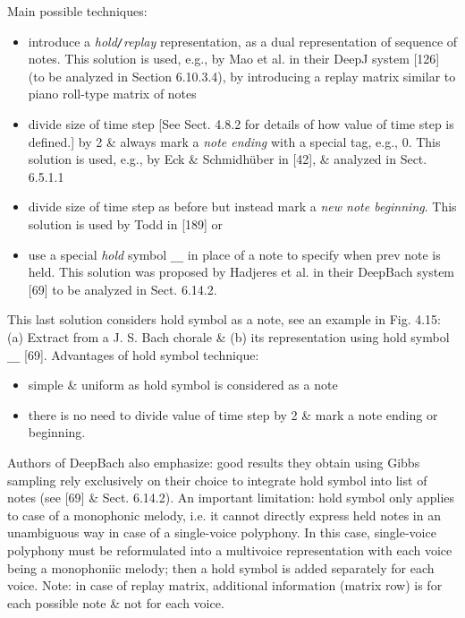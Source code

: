 \documentclass{article}
\begin{document}
\begin{itemize}
\begin{itemize}
\begin{itemize}
			Main possible techniques:
			\begin{itemize}
				\item introduce a {\it hold{\tt/}replay} representation, as a dual representation of sequence of notes. This solution is used, e.g., by Mao et al. in their DeepJ system [126] (to be analyzed in Section 6.10.3.4), by introducing a replay matrix similar to piano roll-type matrix of notes
				\item divide size of time step [See Sect. 4.8.2 for details of how value of time step is defined.] by 2 \& always mark a {\it note ending} with a special tag, e.g., 0. This solution is used, e.g., by {\sc Eck \& Schmidhüber} in [42], \& analyzed in Sect. 6.5.1.1
				\item divide size of time step as before but instead mark a {\it new note beginning}. This solution is used by {\sc Todd} in [189] or
				\item use a special {\it hold} symbol \verb|__| in place of a note to specify when prev note is held. This solution was proposed by Hadjeres et al. in their DeepBach system [69] to be analyzed in Sect. 6.14.2.
			\end{itemize}
			This last solution considers hold symbol as a note, see an example in {\sf Fig. 4.15: (a) Extract from a {\sc J. S. Bach} chorale \& (b) its representation using hold symbol \verb|__| [69].} Advantages of hold symbol technique:
			\begin{itemize}
				\item simple \& uniform as hold symbol is considered as a note
				\item there is no need to divide value of time step by 2 \& mark a note ending or beginning.
			\end{itemize}
			Authors of DeepBach also emphasize: good results they obtain using Gibbs sampling rely exclusively on their choice to integrate hold symbol into list of notes (see [69] \& Sect. 6.14.2). An important limitation: hold symbol only applies to case of a monophonic melody, i.e. it cannot directly express held notes in an unambiguous way in case of a single-voice polyphony. In this case, single-voice polyphony must be reformulated into a multivoice representation with each voice being a monophoniic melody; then a hold symbol is added separately for each voice. Note: in case of replay matrix, additional information (matrix row) is for each possible note \& not for each voice.
			

\end{itemize}
\end{itemize}
\end{itemize}
\end{document}
